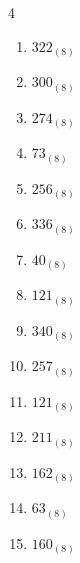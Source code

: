 \begin{multicols}{4}
\begin{enumerate}
        \phantom{$=51$}

  \item $322_{(8)}$

        \phantom{$=210$}

  \item $300_{(8)}$

        \phantom{$=192$}

  \item $274_{(8)}$

        \phantom{$=188$}

  \item $73_{(8)}$

        \phantom{$=59$}

\columnbreak %

\resetques

  \item $256_{(8)}$

        \phantom{$=174$}

  \item $336_{(8)}$

        \phantom{$=222$}

  \item $40_{(8)}$

        \phantom{$=32$}

  \item $121_{(8)}$

        \phantom{$=81$}

  \item $340_{(8)}$

        \phantom{$=224$}

  \item $257_{(8)}$

        \phantom{$=175$}

  \item $121_{(8)}$

        \phantom{$=81$}

  \item $211_{(8)}$

        \phantom{$=137$}

  \item $162_{(8)}$

        \phantom{$=114$}

  \item $63_{(8)}$

        \phantom{$=51$}

  \item $160_{(8)}$


\end{enumerate}
\end{multicols}
